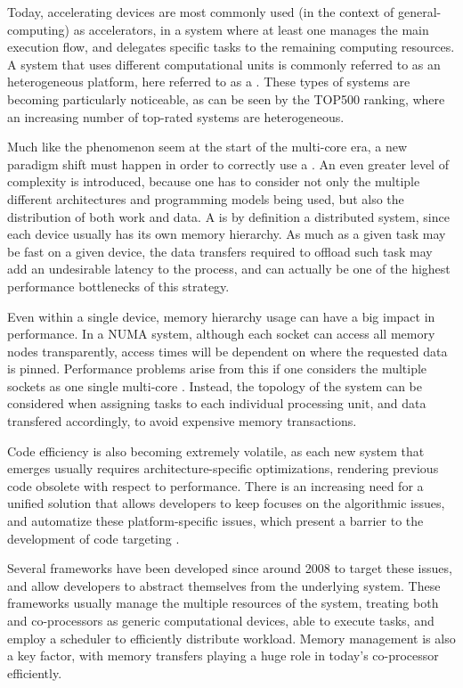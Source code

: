 \documentclass[main.tex]{subfiles}
\begin{document}
Today, accelerating devices are most commonly used (in the context of general-computing) as accelerators, in a system where at least one \cpu manages the main execution flow, and delegates specific tasks to the remaining computing resources. A system that uses different computational units is commonly referred to as an heterogeneous platform, here referred to as a \hetplat. These types of systems are becoming particularly noticeable, as can be seen by the TOP500 ranking, where an increasing number of top-rated systems are heterogeneous.

Much like the phenomenon seem at the start of the multi-core era, a new paradigm shift must happen in order to correctly use a \hetplat. An even greater level of complexity is introduced, because one has to consider not only the multiple different architectures and programming models being used, but also the distribution of both work and data. A \hetplat is by definition a distributed system, since each device usually has its own memory hierarchy. As much as a given task may be fast on a given device, the data transfers required to offload such task may add an undesirable latency to the process, and can actually be one of the highest performance bottlenecks of this strategy.

Even within a single device, memory hierarchy usage can have a big impact in performance. In a \acs{NUMA} system, although each socket can access all memory nodes transparently, access times will be dependent on where the requested data is pinned. Performance problems arise from this if one considers the multiple sockets as one single multi-core \cpu. Instead, the topology of the system can be considered when assigning tasks to each individual processing unit, and data transfered accordingly, to avoid expensive memory transactions.

Code efficiency is also becoming extremely volatile, as each new system that emerges usually requires architecture-specific optimizations, rendering previous code obsolete with respect to performance. There is an increasing need for a unified solution that allows developers to keep focuses on the algorithmic issues, and automatize these platform-specific issues, which present a barrier to the development of code targeting \hetplats.

Several frameworks have been developed since around 2008 to target these issues, and allow developers to abstract themselves from the underlying system. These frameworks usually manage the multiple resources of the system, treating both \cpus and co-processors as generic computational devices, able to execute tasks, and employ a scheduler to efficiently distribute workload. Memory management is also a key factor, with memory transfers playing a huge role in today's co-processor efficiently.
\end{document}
